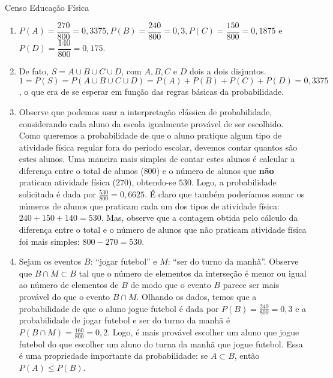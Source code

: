 \begin{answer}{Censo Educação Física}
{
\begin{enumerate}
\item $P(A)=\dfrac{270}{800}=0{,}3375, P(B)=\dfrac{240}{800}=0{,}3, P(C)=\dfrac{150}{800}=0{,}1875$ e $P(D)=\dfrac{140}{800}=0{,}175$.

\item De fato, $S=A\cup B\cup C\cup D$, com $A, B, C $ e $D$ dois a dois disjuntos. $1=P(S)=P(A\cup B\cup C \cup D)=P(A)+P(B)+P(C)+P(D)=0{,}3375$, o que era de se esperar em função das regras básicas da probabilidade.

\item Observe que podemos usar a interpretação clássica de probabilidade, considerando cada aluno da escola igualmente provável de ser escolhido. Como queremos a probabilidade de que o aluno pratique algum tipo de atividade física regular fora do período escolar, devemos contar quantos são estes alunos. Uma maneira mais simples de contar estes alunos é calcular a diferença entre o total de alunos ($800$) e o número de alunos que \textbf{não} praticam atividade física ($270$), obtendo-se $530$. Logo, a probabilidade solicitada é dada por $\frac{530}{800}=0{,}6625$. É claro que também poderíamos somar os números de alunos que praticam cada um dos tipos de atividade física: $240+150+140=530$. Mas, observe que a contagem obtida pelo cálculo da diferença entre o total e o número de alunos que não praticam atividade física foi mais simples: $800−270=530$.

\item  Sejam os eventos $B$: “jogar futebol”{} e $M$: “ser do turno da manhã”. Observe que $B\cap M\subset B$ tal que o número de elementos da interseção é menor ou igual ao número de elementos de $B$ de modo que o evento $B$ parece ser mais provável do que o evento $B\cap M$. Olhando os dados, temos que a probabilidade de que o aluno jogue futebol é dada por $P(B)=\frac{240}{800}=0{,}3$ e a probabilidade de jogar futebol e ser do turno da manhã é $P(B\cap M)=\frac{160}{800}=0{,}2$. Logo, é mais provável escolher um aluno que jogue futebol do que escolher um aluno do turna da manhã que jogue futebol. Essa é uma propriedade importante da probabilidade: se $A\subset B$, então $P(A)\leq P(B)$.


\end{enumerate}}
\end{answer}

